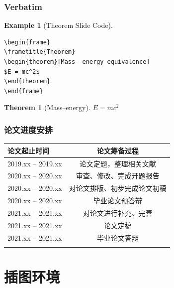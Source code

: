 \documentclass[11pt,compress]{beamer}
\newtheorem{thm}{Theorem}
\numberwithin{thm}{section}
\numberwithin{defn}{section}
\numberwithin{lmm}{section}
\theoremstyle{example}
\newtheorem{exam}{Example}
\numberwithin{figure}{section}
\numberwithin{table}{section}
\numberwithin{equation}{section}
\begin{document}
\begin{frame}[fragile] %
\frametitle{Verbatim}
\begin{exam}[Theorem Slide Code]
\begin{verbatim}
\begin{frame}
\frametitle{Theorem}
\begin{theorem}[Mass--energy equivalence]
$E = mc^2$
\end{theorem}
\end{frame}\end{verbatim}
\end{exam}

\begin{thm}[Mass--energy]
$E = mc^2$
\end{thm}

\end{frame}


\begin{frame}
\frametitle{论文进度安排}
\begin{table}[htp!]
\centering
\renewcommand\arraystretch{1.5} %
\begin{tabularx}{0.92\textwidth}{|P{3.2cm}|C|}
\Xhline{2\arrayrulewidth}
论文起止时间       &  论文筹备过程\\
\hline
2019.xx -- 2019.xx    &  论文定题，整理相关文献\\
\hline
2020.xx -- 2020.xx    &  审查、修改、完成开题报告\\
\hline
2020.xx -- 2020.xx   &  对论文排版、初步完成论文初稿\\
\hline
2020.xx -- 2020.xx    &  毕业论文预答辩\\
\hline
2021.xx -- 2021.xx    &  对论文进行补充、完善\\
\hline
2021.xx -- 2021.xx    &  论文定稿\\
\hline
2021.xx -- 2021.xx    &  毕业论文答辩\\
\Xhline{2\arrayrulewidth}
\end{tabularx}
\end{table}

\end{frame}



\section{插图环境}
\end{document}
